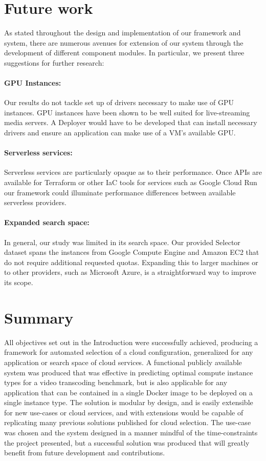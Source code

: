 \documentclass{report}
\begin{document}
\section{Future work}
As stated throughout the design and implementation of our framework and system, there are numerous avenues for extension of our system through the development of different component modules. In particular, we present three suggestions for further research:

\paragraph{GPU Instances:} Our results do not tackle set up of drivers necessary to make use of GPU instances. GPU instances have been shown to be well suited for live-streaming media servers\cite{Lottarini2018}. A Deployer would have to be developed that can install necessary drivers and ensure an application can make use of a VM's available GPU.
\paragraph{Serverless services:} Serverless services are particularly opaque as to their performance. Once APIs are available for Terraform or other IaC tools for services such as Google Cloud Run our framework could illuminate performance differences between available serverless providers.
\paragraph{Expanded search space:} In general, our study was limited in its search space. Our provided Selector dataset spans the instances from Google Compute Engine and Amazon EC2 that do not require additional requested quotas. Expanding this to larger machines or to other providers, such as Microsoft Azure, is a straightforward way to improve its scope. 
\section{Summary}
All objectives set out in the Introduction were successfully achieved, producing a framework for automated selection of a cloud configuration, generalized for any application or search space of cloud services. A functional publicly available system was produced that was effective in predicting optimal compute instance types for a video transcoding benchmark, but is also applicable for any application that can be contained in a single Docker image to be deployed on a single instance type. The solution is modular by design, and is easily extensible for new use-cases or cloud services, and with extensions would be capable of replicating many previous solutions published for cloud selection. The use-case was chosen and the system designed in a manner mindful of the time-constraints the project presented, but a successful solution was produced that will greatly benefit from future development and contributions.
\newpage


\newpage
\end{document}
